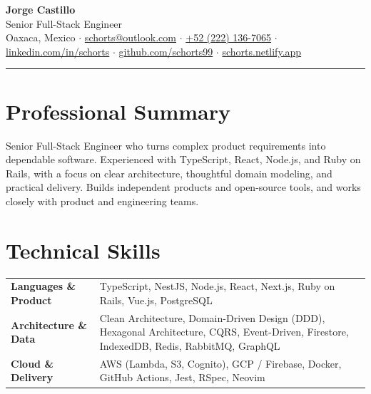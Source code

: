\documentclass[10.5pt,a4paper]{article}
\begin{document}
\begin{center}
  {\LARGE\bfseries Jorge Castillo}\\[4pt]
  {\normalsize\color{muted} Senior Full-Stack Engineer}\\[6pt]
  {\small
    Oaxaca, Mexico
    \enspace\textcolor{accent!60}{$\cdot$}\enspace
    \href{mailto:schorts@outlook.com}{schorts@outlook.com}
    \enspace\textcolor{accent!60}{$\cdot$}\enspace
    \href{tel:+522221367065}{+52 (222) 136-7065}
    \enspace\textcolor{accent!60}{$\cdot$}\enspace
    \href{https://www.linkedin.com/in/schorts}{linkedin.com/in/schorts}
    \enspace\textcolor{accent!60}{$\cdot$}\enspace
    \href{https://github.com/schorts99}{github.com/schorts99}
    \enspace\textcolor{accent!60}{$\cdot$}\enspace
    \href{https://schorts.netlify.app}{schorts.netlify.app}
  }
\end{center}

\vspace{4pt}
{\color{accent!35}\hrule}
\vspace{8pt}

\section{Professional Summary}

Senior Full-Stack Engineer who turns complex product requirements into dependable software.
Experienced with TypeScript, React, Node.js, and Ruby on Rails, with a focus on clear
architecture, thoughtful domain modeling, and practical delivery. Builds independent products
and open-source tools, and works closely with product and engineering teams.

\section{Technical Skills}

\begin{tabularx}{\linewidth}{@{}>{\raggedright\arraybackslash}p{1.55in} X@{}}
  \textbf{Languages \& Product}   & TypeScript, NestJS, Node.js, React, Next.js, Ruby on Rails, Vue.js, PostgreSQL \\[2pt]
  \textbf{Architecture \& Data}   & Clean Architecture, Domain-Driven Design (DDD), Hexagonal Architecture,
                                    CQRS, Event-Driven, Firestore, IndexedDB, Redis, RabbitMQ, GraphQL \\[2pt]
  \textbf{Cloud \& Delivery}      & AWS (Lambda, S3, Cognito), GCP / Firebase, Docker, GitHub Actions,
                                    Jest, RSpec, Neovim \\
\end{tabularx}
\end{document}
